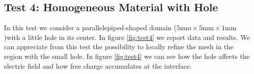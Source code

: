 \documentclass[11pt,a4paper]{article}
\begin{document}
\subsection{Test 4: Homogeneous Material with Hole}
In this test we consider a parallelepiped-shaped domain (\(5\mathrm{mm}\times 5\mathrm{mm}\times 1\mathrm{mm}\))with a little hole in its center. In figure \ref{fig:test4} we report data and results. We can appreciate from this test the possibility to locally refine the mesh in the region with the small hole. In figure \ref{fig:test4} we can see how the hole affects the electric field and how free charge accumulates at the interface.
\begin{figure}
	\centering
	\\
	\hspace*{-0.02\textwidth}
	\hspace*{0.01\textwidth}
\end{figure}
\end{document}
